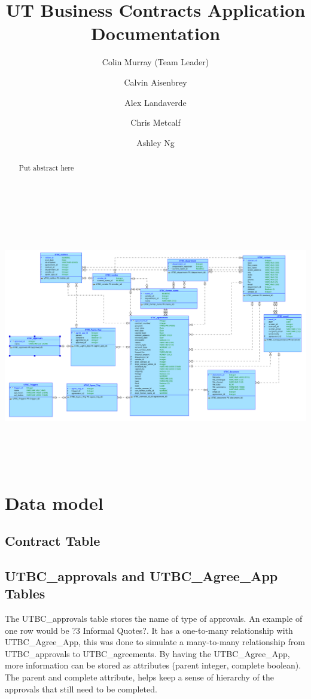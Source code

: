 \documentclass{report}
\begin{document}
\title{\bfseries UT Business Contracts Application Documentation}

\author{
	Colin Murray (Team Leader)
	\and
	Calvin Aisenbrey
	\and
	Alex Landaverde
	\and
	Chris Metcalf
	\and
	Ashley Ng
}

\maketitle

\begin{abstract}
Put abstract here
\end{abstract}

\tableofcontents

\newpage

\begin{image}
\centering
\includegraphics[height = 4.5in, angle = 90]{UTBC_model}
\end{image}



\chapter{Data model}

\section{Contract Table}

\section{UTBC\_approvals and UTBC\_Agree\_App Tables}
The UTBC\_approvals table stores the name of type of approvals. An example of one row would be ?3 Informal Quotes?. It has a one-to-many relationship with UTBC\_Agree\_App, this was done to simulate a many-to-many relationship from UTBC\_approvals to UTBC\_agreements. By having the UTBC\_Agree\_App, more information can be stored as attributes (parent integer, complete boolean). The parent and complete attribute, helps keep a sense of hierarchy of the approvals that still need to be completed. 
\end{document}
